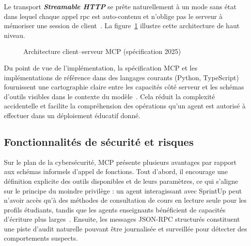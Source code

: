 Le transport \textbf{\emph{Streamable HTTP}} se prête naturellement à un mode
sans état dans lequel chaque appel \gls{rpc} est auto-contenu et n'oblige pas
le serveur à mémoriser une session de
client~\cite{anthropicmcpdocs}. La figure~\ref{fig:mcp-architecture} illustre
cette architecture de haut niveau.

\begin{figure}[H]
\centering
{}
\caption{Architecture client--serveur MCP (spécification 2025)}
\label{fig:mcp-architecture}
\end{figure}

Du point de vue de l'implémentation, la spécification MCP et les implémentations de
référence dans des langages courants (Python, TypeScript) fournissent une cartographie
claire entre les capacités côté serveur et les schémas d'outils visibles dans le
contexte du modèle~\cite{anthropicmcpdocs}. Cela réduit la complexité accidentelle et
facilite la compréhension des opérations qu'un agent est autorisé à effectuer dans un
déploiement éducatif donné.

\subsection{Fonctionnalités de sécurité et risques}

Sur le plan de la cybersécurité, MCP présente plusieurs avantages par rapport aux
schémas informels d'appel de fonctions. Tout d'abord, il encourage une définition
explicite des outils disponibles et de leurs paramètres, ce qui s'aligne sur le
principe du moindre privilège : un agent interagissant avec SprintUp peut n'avoir
accès qu'à des méthodes de consultation de cours en lecture seule pour les profils
étudiants, tandis que les agents enseignants bénéficient de capacités d'écriture plus
larges~\cite{mcpsecurity}. Ensuite, les messages JSON-RPC structurés constituent une
piste d'audit naturelle pouvant être journalisée et surveillée pour détecter des
comportements suspects.

